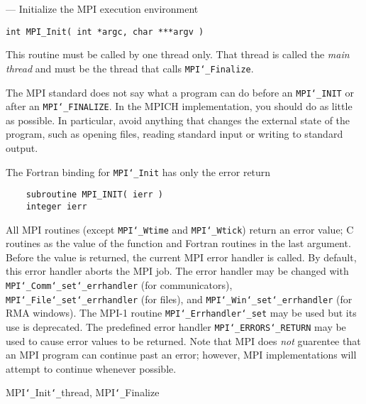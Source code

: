 \startmanpage
{}
--- Initialize the MPI execution environment 
\startvb\begin{verbatim}
int MPI_Init( int *argc, char ***argv )

\end{verbatim}
\endvb

\par
{}
This routine must be called by one thread only.  That thread is called
the {\em main thread} and must be the thread that calls {\tt MPI{\tt \char`\_}Finalize}.
\par
{}
The MPI standard does not say what a program can do before an {\tt MPI{\tt \char`\_}INIT} or
after an {\tt MPI{\tt \char`\_}FINALIZE}.  In the MPICH implementation, you should do
as little as possible.  In particular, avoid anything that changes the
external state of the program, such as opening files, reading standard
input or writing to standard output.
\par
{}
The Fortran binding for {\tt MPI{\tt \char`\_}Init} has only the error return
\begin{verbatim}
    subroutine MPI_INIT( ierr )
    integer ierr
\end{verbatim}

\par
{}
\par
All MPI routines (except {\tt MPI{\tt \char`\_}Wtime} and {\tt MPI{\tt \char`\_}Wtick}) return an error value;
C routines as the value of the function and Fortran routines in the last
argument.  Before the value is returned, the current MPI error handler is
called.  By default, this error handler aborts the MPI job.  The error handler
may be changed with {\tt MPI{\tt \char`\_}Comm{\tt \char`\_}set{\tt \char`\_}errhandler} (for communicators),
{\tt MPI{\tt \char`\_}File{\tt \char`\_}set{\tt \char`\_}errhandler} (for files), and {\tt MPI{\tt \char`\_}Win{\tt \char`\_}set{\tt \char`\_}errhandler} (for
RMA windows).  The MPI-1 routine {\tt MPI{\tt \char`\_}Errhandler{\tt \char`\_}set} may be used but
its use is deprecated.  The predefined error handler
{\tt MPI{\tt \char`\_}ERRORS{\tt \char`\_}RETURN} may be used to cause error values to be returned.
Note that MPI does {\em not} guarentee that an MPI program can continue past
an error; however, MPI implementations will attempt to continue whenever
possible.
\par
{}
\par
{}
 MPI{\tt \char`\_}Init{\tt \char`\_}thread, MPI{\tt \char`\_}Finalize
\nextline
{}
\endmanpage
